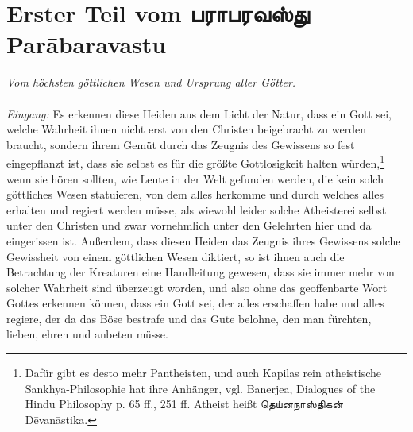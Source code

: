 \documentclass{article}
\newcommand{\TamilText}[1]{\texttamil{#1}}
\newcommand{\TamilBold}[1]{\texttamil{\textbf{#1}}}
\newcommand{\tam}[1]{\TamilText{#1}}
\newcommand{\tambold}[1]{\TamilBold{#1}}
\begin{document}
\section{\textgerman{Erster Teil vom} \tambold{பராபரவஸ்து} \textgerman{Par\={a}baravastu}}
\begin{center}
\emph{Vom höchsten göttlichen Wesen und Ursprung aller Götter.}
\end{center}
\paragraph{}
\emph{Eingang:} Es erkennen diese Heiden aus dem Licht der Natur, dass ein Gott sei, welche Wahrheit ihnen nicht erst von den Christen beigebracht zu werden braucht, sondern ihrem Gemüt durch das Zeugnis des Gewissens so fest eingepflanzt ist, dass sie selbst es für die größte Gottlosigkeit halten würden,\footnote{Dafür gibt es desto mehr Pantheisten, und auch Kapilas rein atheistische Sankhya-Philosophie hat ihre Anhänger, vgl. Banerjea, Dialogues of the Hindu Philosophy p. 65 ff., 251 ff. Atheist heißt \tam{தெய்னநாஸ்திகன்} D\={e}van\={a}stika.} wenn sie hören sollten, wie Leute in der Welt gefunden werden, die kein solch göttliches Wesen statuieren, von dem alles herkomme und durch welches alles erhalten und regiert werden müsse, als wiewohl leider solche Atheisterei selbst unter den Christen und zwar vornehmlich unter den Gelehrten hier und da eingerissen ist. Außerdem, dass diesen Heiden das Zeugnis ihres Gewissens solche Gewissheit von einem göttlichen Wesen diktiert, so ist ihnen auch die Betrachtung der Kreaturen eine Handleitung gewesen, dass sie immer mehr von solcher Wahrheit sind überzeugt worden, und also ohne das geoffenbarte Wort Gottes erkennen können, dass ein Gott sei, der alles erschaffen habe und alles regiere, der da das Böse bestrafe und das Gute belohne, den man fürchten, lieben, ehren und anbeten müsse.
\end{document}
